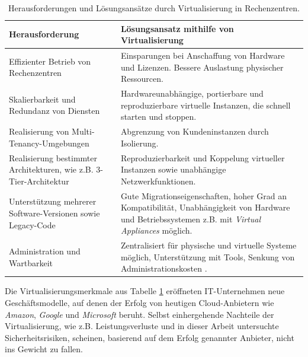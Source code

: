 \documentclass[../main.tex]{subfiles}
\begin{document}
		\vspace{0.5cm}
		\begin{table}[htp]
			\begin{centering}
			\begin{tabularx}{\textwidth}{>{\hsize=1\hsize}X|>{\hsize=1\hsize}X}
				\hline
				\textbf{Herausforderung} & \textbf{Lösungsansatz mithilfe von Virtualisierung} \\
				\hline
				Effizienter Betrieb von Rechenzentren
				& Einsparungen bei Anschaffung von Hardware und Lizenzen. Bessere Auslastung physischer Ressourcen. \\
				\hline
				Skalierbarkeit und Redundanz von Diensten
				& Hardwareunabhängige, portierbare und reproduzierbare virtuelle Instanzen, die schnell starten und stoppen. \\
				\hline
				Realisierung von Multi-Tenancy-Umgebungen
				& Abgrenzung von Kundeninstanzen durch Isolierung. \\
				\hline
				Realisierung bestimmter Architekturen, wie z.B. 3-Tier-Architektur
				& Reproduzierbarkeit und Koppelung virtueller Instanzen sowie unabhängige Netzwerkfunktionen. \\
				\hline
				Unterstützung mehrerer Software-Versionen sowie Legacy-Code
				& Gute Migrationseigenschaften, hoher Grad an Kompatibilität, Unabhängigkeit von Hardware und Betriebssystemen z.B. mit \emph{Virtual Appliances} möglich.\\
				\hline
				Administration und Wartbarkeit
				& Zentralisiert für physische und virtuelle Systeme möglich, Unterstützung mit Tools, Senkung von Administrationskosten \cite[S.1]{bsiVirt}. \\
				\hline
		  \end{tabularx}
			\vspace{0.5cm}
			\caption{Herausforderungen und Lösungsansätze durch Virtualisierung in Rechenzentren.}
			\label{tab:virtAdvantages}
			\end{centering}
		\end{table}

		Die Virtualisierungsmerkmale aus Tabelle \ref{tab:virtAdvantages} eröffneten IT-Unternehmen neue Geschäftsmodelle, auf denen der Erfolg von heutigen Cloud-Anbietern wie \emph{Amazon}, \emph{Google} und \emph{Microsoft} beruht. Selbst einhergehende Nachteile der Virtualisierung, wie z.B. Leistungsverluste und in dieser Arbeit untersuchte Sicherheitsrisiken, scheinen, basierend auf dem Erfolg genannter Anbieter, nicht ins Gewicht zu fallen.
\end{document}

